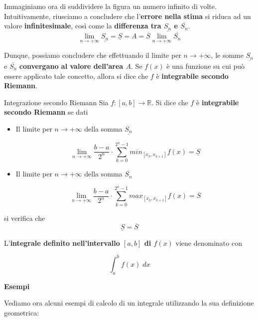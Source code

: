 \documentclass[a4paper, 12pt]{report}
\begin{document}
    Immaginiamo ora di suddividere la figura un numero infinito di volte. Intuitivamente, riusciamo a concludere che l'\textbf{errore nella stima} si riduca ad un valore \textbf{infinitesimale}, così come la \textbf{differenza tra $\underline{S_n}$ e $\overline{S_n}$}.
    \[ \lim_{n \to +\infty} \underline{S_n} = \underline{S} = A = \overline{S} \lim_{n \to +\infty} \overline{S_n}\]
    
    Dunque, possiamo concludere che effettuando il limite per $n \to +\infty$, le somme $\underline{S_n}$ e $\overline{S_n}$ \textbf{convergano al valore dell'area $A$}. Se $f(x)$ è una funzione su cui può essere applicato tale concetto, allora si dice che $f$ è \textbf{integrabile secondo Riemann}.
    
    \begin{frameddefn}{Integrazione secondo Riemann}
        Sia $f: [a,b] \to \mathbb{R}$. Si dice che $f$ è \textbf{integrabile secondo Riemann} se dati
        
        \begin{itemize}
            \item Il limite per $n \to +\infty$ della somma $\underline{S_n}$
        
            \[ \lim_{n \to +\infty} \frac{b-a}{2^n} \cdot \sum_{k=0}^{2^n-1} min_{[x_k, x_{k+1}]} f(x) = \underline{S} \]
        
            \item Il limite per $n \to +\infty$ della somma $\overline{S_n}$
            
            \[ \lim_{n \to +\infty} \frac{b-a}{2^n} \cdot \sum_{k=0}^{2^n-1} max_{[x_k, x_{k+1}]} f(x) = \overline{S}\]
            
        \end{itemize}
        
        si verifica che
        \[\underline{S} = \overline{S}\]
        
        L'\textbf{integrale definito nell'intervallo $[a,b]$ di $f(x)$} viene denominato con
        
        \[ \int_{a}^{b} f(x) \; dx\]
    \end{frameddefn}
    
    \newpage

    \textbf{Esempi}
    
    Vediamo ora alcuni esempi di calcolo di un integrale utilizzando la sua definizione geometrica:
    
\end{document}
